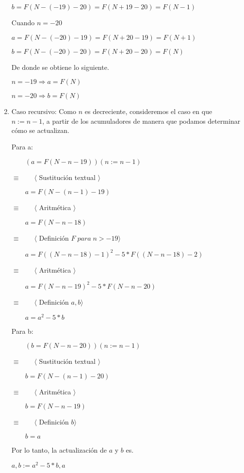 \documentclass[hidelinks]{article}
\begin{document}
\begin{enumerate}
	      $b = F(N - (-19) - 20) = F(N + 19 - 20) = F(N - 1)$\par
	      Cuando $n = -20$\par
	      $a = F(N - (-20) - 19) = F(N + 20 - 19) = F(N + 1)$\par
	      $b = F(N - (-20) - 20) = F(N + 20 - 20) = F(N)$\par
	      De donde se obtiene lo siguiente.\par
	      \begin{center}
		      $n = -19 \Rightarrow a = F(N)$\par
		      $n = -20 \Rightarrow b = F(N)$\par
	      \end{center}
	\item Caso recursivo: Como $n$ es decreciente, consideremos el caso en que $n := n -
		      1$, a partir de los acumuladores de manera que podamos determinar cómo se
	      actualizan.\par
		  Para a:\par
	      $\qquad (a = F(N - n - 19))(n := n - 1)$\par
		  $\equiv \qquad \langle$ Sustitución textual $\rangle$\par
	      $\qquad a = F(N - (n - 1) - 19)$\par
		  $\equiv \qquad \langle$ Aritmética $\rangle$\par
	      $\qquad a = F(N - n - 18)$\par
		  $\equiv \qquad \langle$ Definición $F \; para\; n > -19\rangle$\par
	      $\qquad a = F((N - n - 18) - 1)^2 - 5 * F((N - n - 18) - 2)$\par
		  $\equiv \qquad \langle$ Aritmética $\rangle$\par
	      $\qquad a = F(N - n - 19)^2 - 5 * F(N - n - 20)$\par
		  $\equiv \qquad \langle$ Definición $a,b\rangle$\par
	      $\qquad a = a^2 - 5 * b$\par

		  Para b:\par
	      $\qquad (b = F(N - n - 20))(n := n - 1)$\par
		  $\equiv \qquad \langle$ Sustitución textual $\rangle$\par
	      $\qquad b = F(N - (n - 1) - 20)$\par
		  $\equiv \qquad \langle$ Aritmética $\rangle$\par
	      $\qquad b = F(N - n - 19)$\par
		  $\equiv \qquad \langle$ Definición $b\rangle$\par
	      $\qquad b = a$\par

		  Por lo tanto, la actualización de $a$ y $b$ es.\par

		  \begin{center}
			$a,b := a^2 - 5 * b, a$\par
		  \end{center}
\end{enumerate}
\end{document}
